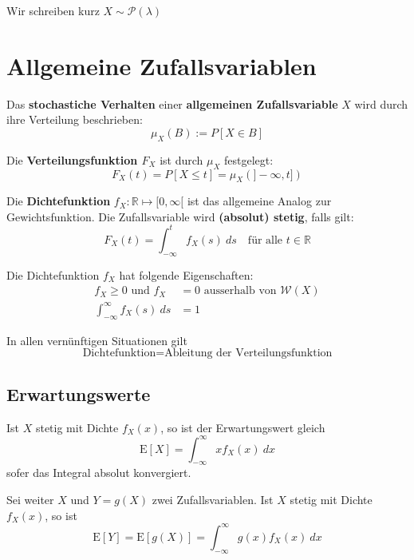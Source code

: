 \documentclass[11pt]{article}
\newcommand{\E}{\text{E}}
\begin{document}
Wir schreiben kurz $X \sim \mathcal{P}(\lambda)$

\section{Allgemeine Zufallsvariablen}

Das \textbf{stochastiche Verhalten} einer \textbf{allgemeinen Zufallsvariable} $X$ wird durch ihre Verteilung beschrieben:
\begin{equation*}
	\mu_X(B) := P[X \in B] 
\end{equation*}

Die \textbf{Verteilungsfunktion $F_X$} ist durch $\mu_X$ festgelegt:
\begin{equation*}
	F_X(t) = P[X \leq t] = \mu_X(]-\infty,t])
\end{equation*}

Die \textbf{Dichtefunktion} $f_X: \mathbb{R} \mapsto [0,\infty[$ ist das allgemeine Analog zur Gewichtsfunktion. Die Zufallsvariable wird \textbf{(absolut) stetig}, falls gilt:
\begin{equation*}
	F_X(t) = \int_{-\infty}^t f_X(s)\ ds \quad\text{f{\"u}r alle }t\in \mathbb{R}
\end{equation*}

Die Dichtefunktion $f_X$ hat folgende Eigenschaften:
\begin{equation*}
\begin{split}
	f_X \geq 0 \text{ und } f_X & = 0\text{ ausserhalb von } \mathcal{W}(X) \\
	\int_{-\infty}^\infty f_X(s)\ ds & = 1
\end{split}
\end{equation*}

In allen vern{\"u}nftigen Situationen gilt
\begin{equation*}
	\text{Dichtefunktion} = \text{Ableitung der Verteilungsfunktion}
\end{equation*}

\subsection{Erwartungswerte}

Ist $X$ stetig mit Dichte $f_X(x)$, so ist der Erwartungswert gleich
\begin{equation*}
	\E[X] = \int_{-\infty}^\infty x f_X(x)\ dx
\end{equation*}
sofer das Integral absolut konvergiert.

Sei weiter $X$ und $Y = g(X)$ zwei Zufallsvariablen. Ist $X$ stetig mit Dichte $f_X(x)$, so ist
\begin{equation*}
	\E[Y] = \E[g(X)] = \int_{-\infty}^\infty g(x)f_X(x)\ dx
\end{equation*} 
\end{document}
